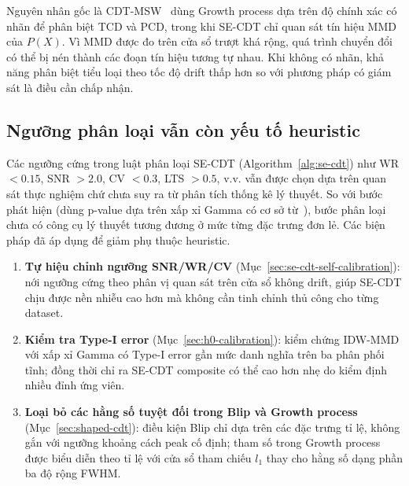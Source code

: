 Nguyên nhân gốc là CDT-MSW~\cite{guo2022cdtmsw} dùng Growth process dựa trên độ chính xác có nhãn để phân biệt TCD và PCD, trong khi SE-CDT chỉ quan sát tín hiệu MMD của $P(X)$. Vì MMD được đo trên cửa sổ trượt khá rộng, quá trình chuyển đổi có thể bị nén thành các đoạn tín hiệu tương tự nhau. Khi không có nhãn, khả năng phân biệt tiểu loại theo tốc độ drift thấp hơn so với phương pháp có giám sát là điều cần chấp nhận.

\subsection{Ngưỡng phân loại vẫn còn yếu tố heuristic}
\label{sec:limitation-heuristic}
Các ngưỡng cứng trong luật phân loại SE-CDT (Algorithm~\ref{alg:se-cdt}) như WR $< 0.15$, SNR $> 2.0$, CV $< 0.3$, LTS $> 0.5$, v.v. vẫn được chọn dựa trên quan sát thực nghiệm chứ chưa suy ra từ phân tích thống kê lý thuyết. So với bước phát hiện (dùng p-value dựa trên xấp xỉ Gamma có cơ sở từ~\cite{gretton2009gamma}), bước phân loại chưa có công cụ lý thuyết tương đương ở mức từng đặc trưng đơn lẻ. Các biện pháp đã áp dụng để giảm phụ thuộc heuristic.
\begin{enumerate}
	\item \textbf{Tự hiệu chỉnh ngưỡng SNR/WR/CV} (Mục~\ref{sec:se-cdt-self-calibration}): nới ngưỡng cứng theo phân vị quan sát trên cửa sổ không drift, giúp SE-CDT chịu được nền nhiễu cao hơn mà không cần tinh chỉnh thủ công cho từng dataset.
	\item \textbf{Kiểm tra Type-I error} (Mục~\ref{sec:h0-calibration}): kiểm chứng IDW-MMD với xấp xỉ Gamma có Type-I error gần mức danh nghĩa trên ba phân phối tĩnh; đồng thời chỉ ra SE-CDT composite có thể cao hơn nhẹ do kiểm định nhiều đỉnh ứng viên.
	\item \textbf{Loại bỏ các hằng số tuyệt đối trong Blip và Growth process} (Mục~\ref{sec:shaped-cdt}): điều kiện Blip chỉ dựa trên các đặc trưng tỉ lệ, không gắn với ngưỡng khoảng cách peak cố định; tham số trong Growth process được biểu diễn theo tỉ lệ với cửa sổ tham chiếu $l_1$ thay cho hằng số dạng phần ba độ rộng FWHM.
\end{enumerate}

